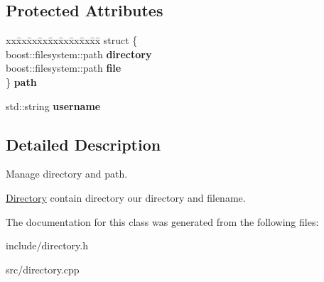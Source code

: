 \subsection*{Protected Attributes}
\begin{DoxyCompactItemize}
\item 
\mbox{\label{class_directory_a7a883ac4b3a81b11521af22a0f66a112}} 
\begin{tabbing}
xx\=xx\=xx\=xx\=xx\=xx\=xx\=xx\=xx\=\kill
struct \{\\
\>boost::filesystem::path {\bfseries directory}\\
\>boost::filesystem::path {\bfseries file}\\
\} {\bfseries path}\\

\end{tabbing}\item 
\mbox{\label{class_directory_afabc4c126084ec2539411a110c3fc922}} 
std\+::string {\bfseries username}
\end{DoxyCompactItemize}


\subsection{Detailed Description}
Manage directory and path. 

\mbox{\hyperlink{class_directory}{Directory}} contain directory our directory and filename. 

The documentation for this class was generated from the following files\+:\begin{DoxyCompactItemize}
\item 
include/directory.\+h\item 
src/directory.\+cpp\end{DoxyCompactItemize}
